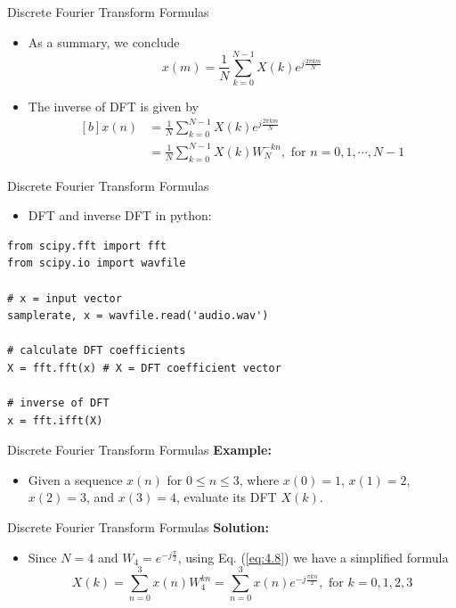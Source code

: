 \documentclass[pdflatex,compress,mathserif]{beamer}
\begin{document}
\begin{frame}{Discrete Fourier Transform Formulas}
    \begin{itemize}
        \item As a summary, we conclude
        \begin{equation}
            x(m) = \frac{1}{N} \sum_{k=0}^{N-1} X(k) e^{j\frac{2 \pi km}{N}}
        \end{equation}
        \item The inverse of DFT is given by
        \begin{equation}
            \begin{aligned}[b]
                x(n) &= \frac{1}{N} \sum_{k=0}^{N-1} X(k) e^{j\frac{2 \pi km}{N}} \\
                &= \frac{1}{N} \sum_{k=0}^{N-1} X(k) W_N^{-kn}, \text{ for } n=0,1,\cdots,N-1
            \end{aligned}
        \end{equation}
    \end{itemize}
\end{frame}

\begin{frame}[fragile]{Discrete Fourier Transform Formulas}
    \begin{itemize}
        \item DFT and inverse DFT in python:
    \end{itemize}
    \begin{verbatim}
from scipy.fft import fft
from scipy.io import wavfile

# x = input vector
samplerate, x = wavfile.read('audio.wav')

# calculate DFT coefficients
X = fft.fft(x) # X = DFT coefficient vector

# inverse of DFT
x = fft.ifft(X)
    \end{verbatim}
\end{frame}

\begin{frame}[fragile]{Discrete Fourier Transform Formulas}
    \textbf{Example:}
    \begin{itemize}
        \item Given a sequence $x(n)$ for $0 \leq n \leq 3$, where $x(0) = 1$, $x(1) = 2$, $x(2) = 3$, and $x(3) = 4$, evaluate its DFT $X(k)$.
    \end{itemize}
\end{frame}

\begin{frame}[fragile]{Discrete Fourier Transform Formulas}
    \textbf{Solution:}
    \begin{itemize}
        \item Since $N = 4$ and $W_4 = e^{-j\frac{\pi}{2}}$, using Eq. (\ref{eq:4.8}) we have a simplified formula
        \begin{equation*}
            X(k) = \sum_{n=0}^{3} x(n) W_{4}^{kn} = \sum_{n=0}^{3} x(n)e^{-j\frac{\pi kn}{2}},\text{ for } k = 0,1,2,3
        \end{equation*}
    \end{itemize}
\end{frame}
\end{document}
